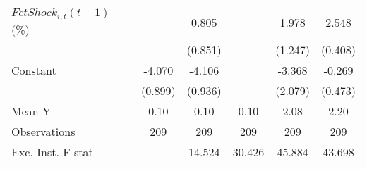 {\begin{tabular}{l*{5}{c}}
\addlinespace
$ FctShock_{i,t}(t+1)$ (\%)&                     &       0.805         &                     &       1.978         &       2.548\sym{***}\\
                    &                     &     (0.851)         &                     &     (1.247)         &     (0.408)         \\
\addlinespace
Constant            &      -4.070\sym{***}&      -4.106\sym{***}&                     &      -3.368         &      -0.269         \\
                    &     (0.899)         &     (0.936)         &                     &     (2.079)         &     (0.473)         \\
\midrule
Mean Y              &        0.10         &        0.10         &        0.10         &        2.08         &        2.20         \\
Observations        &         209         &         209         &         209         &         209         &         209         \\
Exc. Inst. F-stat   &                     &      14.524         &      30.426         &      45.884         &      43.698         \\
\bottomrule
\end{tabular}
}

